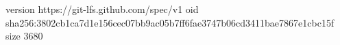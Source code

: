 version https://git-lfs.github.com/spec/v1
oid sha256:3802cb1ca7d1e156cec07bb9ac05b7ff6fae3747b06cd3411bae7867e1cbc15f
size 3680
